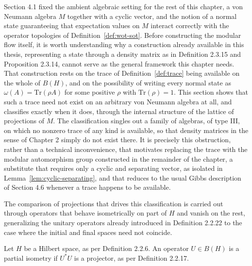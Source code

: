 Section 4.1 fixed the ambient algebraic setting for the rest of this
chapter, a von Neumann algebra $M$ together with a cyclic vector, and
the notion of a normal state guaranteeing that expectation values on
$M$ interact correctly with the operator topologies of
Definition~\ref{def:wot-sot}. Before constructing the modular flow
itself, it is worth understanding why a construction already available
in this thesis, representing a state through a density matrix as in
Definition 2.3.15 and Proposition 2.3.14, cannot serve as the general
framework this chapter needs. That construction rests on the trace of
Definition~\ref{def:trace} being available on the whole of $B(H)$, and
on the possibility of writing every normal state as $\omega(A) =
\mathrm{Tr}(\rho A)$ for some positive $\rho$ with $\mathrm{Tr}(\rho) =
1$. This section shows that such a trace need not exist on an
arbitrary von Neumann algebra at all, and classifies exactly when it
does, through the internal structure of the lattice of projections of
$M$. The classification singles out a family of algebras, of type III,
on which no nonzero trace of any kind is available, so that density
matrices in the sense of Chapter 2 simply do not exist there. It is
precisely this obstruction, rather than a technical inconvenience, that
motivates replacing the trace with the modular automorphism group
constructed in the remainder of the chapter, a substitute that requires
only a cyclic and separating vector, as isolated in
Lemma~\ref{lem:cyclic-separating}, and that reduces to the usual Gibbs
description of Section 4.6 whenever a trace happens to be available.

The comparison of projections that drives this classification is
carried out through operators that behave isometrically on part of $H$
and vanish on the rest, generalizing the unitary operators already
introduced in Definition 2.2.22 to the case where the initial and final
spaces need not coincide.

\begin{definition}\label{def:partial-isometry}
	Let $H$ be a Hilbert space, as per Definition 2.2.6. An operator
	$U \in B(H)$ is a partial isometry if $U^*U$ is a projector, as per
	Definition 2.2.17.
\end{definition}

